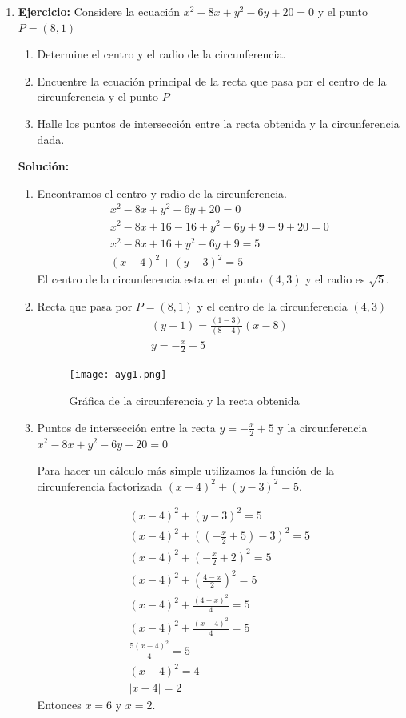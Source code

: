 \documentclass[a4paper,10pt]{article}
\providecommand{\abs}[1]{\lvert#1\rvert}
\begin{document}
\begin{enumerate}
\newpage

\item \textbf{Ejercicio:} Considere la ecuación $x^2-8x+y^2-6y+20=0$ y el punto $P = (8,1)$ \\
\begin{enumerate}
\item Determine el centro y el radio de la circunferencia.
\item Encuentre la ecuación principal de la recta que pasa por el centro de la circunferencia y el punto $P$
\item Halle los puntos de intersección entre la recta obtenida y la circunferencia dada. 
\end{enumerate}
\textbf{Solución:}

\begin{enumerate}
\item Encontramos el centro y radio de la circunferencia.
\begin{gather*}
x^2-8x+y^2-6y+20=0\\
x^2-8x+16-16+y^2-6y+9-9+20=0\\
x^2-8x+16+y^2-6y+9=5\\
(x-4)^2+(y-3)^2=5
\end{gather*}
El centro de la circunferencia esta en el punto $(4,3)$ y el radio es $\sqrt{5}$.

\item Recta que pasa por $P=(8,1)$ y el centro de la circunferencia $(4,3)$
\begin{gather*}
(y-1)= \frac{(1-3)}{(8-4)}(x-8)\\
y= -\frac{x}{2}+5
\end{gather*}

\begin{figure}[ht]
    \centering
    \texttt{[image: ayg1.png]}
    \caption{Gráfica de la circunferencia y la recta obtenida}
    \label{ej3}
\end{figure}


\item Puntos de intersección entre la recta $y= -\frac{x}{2}+5$ y la circunferencia $x^2-8x+y^2-6y+20=0$

Para hacer un cálculo más simple utilizamos la función de la circunferencia factorizada $(x-4)^2+(y-3)^2=5$.

\begin{gather*}
(x-4)^2+(y-3)^2=5\\
(x-4)^2+((-\frac{x}{2}+5)-3)^2=5\\
(x-4)^2+(-\frac{x}{2}+2)^2=5\\
(x-4)^2+(\frac{4-x}{2})^2=5\\
(x-4)^2+\frac{(4-x)^2}{4}=5\\
(x-4)^2+\frac{(x-4)^2}{4}=5\\
\frac{5(x-4)^2}{4}=5\\
(x-4)^2=4\\
\abs{x-4}=2
\end{gather*}
Entonces $x=6$ y $x=2$.\\


\end{enumerate}
\end{enumerate}
\end{document}
